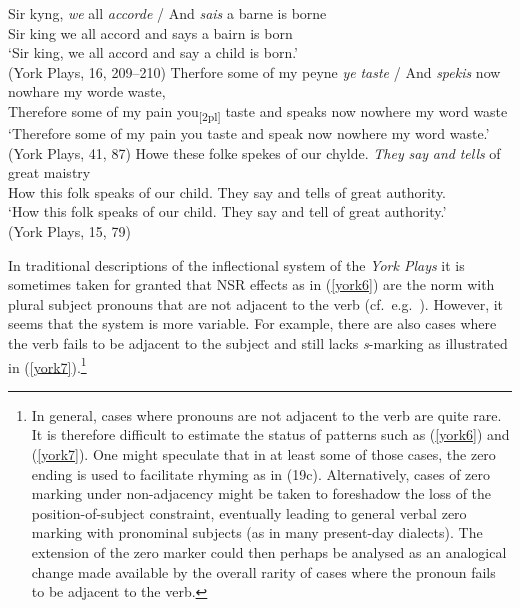 \documentclass[output=paper]{langsci/langscibook}
\begin{document}
\ea
\label{york6}
\ea \gll Sir kyng, \textit{we} all \textit{accorde} / And \textit{sais} a barne is borne \\
Sir king we all accord {} and says a bairn is born\\
\glt `Sir king, we all accord and say a child is born.'\\
(York Plays, 16, 209--210)
\ex \gll Therfore some of my peyne \textit{ye} \textit{taste} / And \textit{spekis} now nowhare my worde waste, \\
Therefore some of my pain you\textsubscript{[2pl]} taste {} and speaks now nowhere my word waste\\
\glt `Therefore some of my pain you taste and speak now nowhere my word waste.'\\
(York Plays, 41, 87)
\ex
\gll Howe these folke spekes of our chylde. \textit{They} \textit{say} \textit{and} \textit{tells} of great maistry \\
How this folk speaks of our child. They say and tells of great authority. \\
\glt `How this folk speaks of our child. They say and tell of great authority.'\\
(York Plays, 15, 79)
\z
\z

In traditional descriptions of the inflectional system of the \emph{York Plays}
it is sometimes taken for granted that \gls{NSR}
effects as in (\ref{york6}) are the norm with plural subject pronouns that are
not adjacent to the verb (cf.\ e.g.\ \citealt[272]{BurrowTurville-Petre:2005}).
However, it seems that the  system is more variable. For
example, there are also cases where the verb fails to be adjacent to the
subject and still lacks \emph{s}-marking as illustrated in
(\ref{york7}).\footnote{In general, cases where pronouns are not adjacent to
the verb are quite rare. It is therefore difficult to estimate the status of
patterns such as (\ref{york6}) and (\ref{york7}). One might speculate that in
at least some of those cases, the zero ending is used to facilitate rhyming as
in (19c). Alternatively, cases of zero marking under non-adjacency might be
taken to foreshadow the loss of the position-of-subject constraint, eventually
leading to general verbal zero marking with pronominal subjects (as in many
present-day dialects). The extension of the zero marker could then perhaps be
analysed as an analogical change made available by the overall rarity of cases
where the pronoun fails to be adjacent to the verb.}
\end{document}
